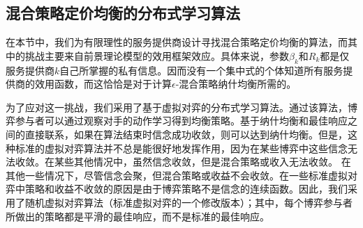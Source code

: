 \subsection{混合策略定价均衡的分布式学习算法}
在本节中，我们为有限理性的服务提供商设计寻找混合策略定价均衡的算法，而其中的挑战主要来自前景理论模型的效用框架效应。具体来说，参数$\beta_k$和$R_k$都是仅服务提供商$k$自己所掌握的私有信息。因而没有一个集中式的个体知道所有服务提供商的效用函数，而这恰恰是对于计算$\epsilon$-混合策略纳什均衡所需的。

为了应对这一挑战，我们采用了基于虚拟对弈的分布式学习算法。通过该算法，博弈参与者可以通过观察对手的动作学习得到均衡策略。基于纳什均衡和最佳响应之间的直接联系，如果在算法结束时信念成功收敛，则可以达到纳什均衡。但是，这种标准的虚拟对弈算法并不总是能很好地发挥作用，因为在某些博弈中这些信念无法收敛。在某些其他情况中，虽然信念收敛，但是混合策略或收入无法收敛。
在其他一些情况下，尽管信念会聚，但混合策略或收益不会收敛。在一些标准虚拟对弈中策略和收益不收敛的原因是由于博弈策略不是信念的连续函数。因此，我们采用了随机虚拟对弈算法（标准虚拟对弈的一个修改版本）；其中，每个博弈参与者所做出的策略都是平滑的最佳响应，而不是标准的最佳响应。


